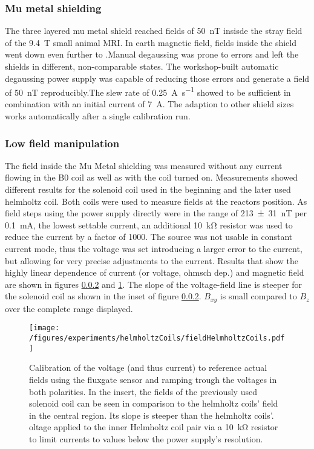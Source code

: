         \subsubsection{Mu metal shielding}
            The three layered mu metal shield reached fields of \SI{50}{\nano\tesla} insisde the stray field of the \SI{9.4}{\tesla} small animal MRI. In earth magnetic field, fields inside the shield went down even further to .Manual degaussing was prone to errors and left the shields in different, non-comparable states. The workshop-built automatic degaussing power supply was capable of reducing those errors and generate a field of \SI{50}{\nano\tesla} reproducibly.The slew rate of \SI{0.25}{\ampere\per\second} showed to be sufficient in combination with an initial current of \SI{7}{\ampere}. The adaption to other shield sizes works automatically after a single calibration run.
        \subsubsection{Low field manipulation}
        The field inside the Mu Metal shielding was measured without any current flowing in the B0 coil as well as with the coil turned on. Measurements showed different results for the solenoid coil used in the beginning and the later used helmholtz coil. Both coils were used to measure fields at the reactors position. As field steps using the power supply directly were in the range of \SI{213\pm 31}{\nano\tesla} per \SI{0.1}{\milli\ampere}, the lowest settable current, an additional \SI{10}{\kilo\ohm} resistor was used to reduce the current by a factor of 1000. The source was not usable in constant current mode, thus the voltage was set introducing a larger error to the current, but allowing for very precise adjustments to the current. Results that show the highly linear dependence of current (or voltage, ohmsch dep.) and magnetic field are shown in figures \ref{} and \ref{figures:results:helmholtzCoilsCenterField}. The slope of the voltage-field line is steeper for the solenoid coil as shown in the inset of figure \ref{}. $B_{xy}$ is small compared to $B_z$ over the complete range displayed.
            \begin{figure}
                \centering
                \label{figures:results:helmholtzCoilsCenterField}
                \texttt{[image: /figures/experiments/helmholtzCoils/fieldHelmholtzCoils.pdf]}
                \caption{Calibration of the voltage (and thus current) to reference actual fields using the fluxgate sensor and ramping trough the voltages in both polarities. In the insert, the fields of the previously used solenoid coil can be seen in comparison to the helmholtz coils' field in the central region. Its slope is steeper than the helmholtz coils'. oltage applied to the inner Helmholtz coil pair via a \SI{10}{\kilo\ohm} resistor to limit currents to values below the power supply's resolution.}
            \end{figure}
            
